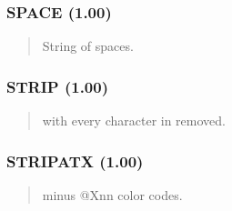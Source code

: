 \documentclass[letterpaper,10pt,english]{sphinxmanual}
\begin{document}
\subsubsection{SPACE (1.00)}
\label{\detokenize{ppl:space-1-00}}\begin{quote}

\sphinxAtStartPar
{}
\begin{description}
\sphinxAtStartPar
String of  spaces.

\end{description}
\end{quote}


\subsubsection{STRIP (1.00)}
\label{\detokenize{ppl:strip-1-00}}\begin{quote}

\sphinxAtStartPar
{}
\begin{description}
\sphinxAtStartPar
{} with every character in  removed.

\end{description}
\end{quote}


\subsubsection{STRIPATX (1.00)}
\label{\detokenize{ppl:stripatx-1-00}}\begin{quote}

\sphinxAtStartPar
{}
\begin{description}
\sphinxAtStartPar
{} minus @Xnn color codes.

\end{description}
\end{quote}
\end{document}
